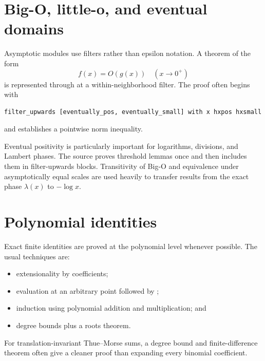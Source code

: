 \documentclass[11pt,oneside]{report}
\theoremstyle{definition}
\theoremstyle{remark}
\DeclareRobustCommand{\lean}[1]{\texorpdfstring{\texttt{\expandafter\seqsplit\expandafter{\detokenize{#1}}}}{\detokenize{#1}}}
\begin{document}
\section{Big-O, little-o, and eventual domains}
Asymptotic modules use filters rather than epsilon notation.  A theorem of the form
\[
  f(x)=O(g(x))\quad(x\to0^+)
\]
is represented through \lean{IsBigO} at a within-neighborhood filter.  The proof often begins with
\begin{lstlisting}
filter_upwards [eventually_pos, eventually_small] with x hxpos hxsmall
\end{lstlisting}
and establishes a pointwise norm inequality.

Eventual positivity is particularly important for logarithms, divisions, and Lambert phases.  The source proves threshold lemmas once and then includes them in filter-upwards blocks.  Transitivity of Big-O and equivalence under asymptotically equal scales are used heavily to transfer results from the exact phase \(\lambda(x)\) to \(-\log x\).

\section{Polynomial identities}
Exact finite identities are proved at the polynomial level whenever possible.  The usual techniques are:
\begin{itemize}
  \item extensionality by coefficients;
  \item evaluation at an arbitrary point followed by \lean{ring};
  \item induction using polynomial addition and multiplication; and
  \item degree bounds plus a roots theorem.
\end{itemize}
For translation-invariant Thue--Morse sums, a degree bound and finite-difference theorem often give a cleaner proof than expanding every binomial coefficient.
\end{document}
